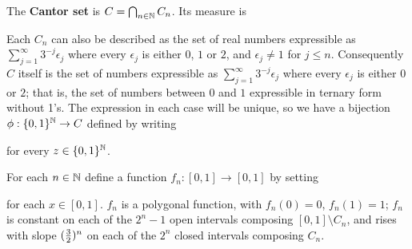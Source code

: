 \medskip
     
The {\bf Cantor set} is $C=\bigcap_{n\in\Bbb N}C_n$.   Its
measure is
     
     
 Each $C_n$ can also be described as the set of
real numbers
expressible as $\sum_{j=1}^{\infty}3^{-j}\epsilon_j$ where every
$\epsilon_j$ is either $0$, $1$ or $2$, and $\epsilon_j\ne 1$ for $j\le
n$.   Consequently $C$ itself is the set of numbers expressible as
$\sum_{j=1}^{\infty}3^{-j}\epsilon_j$ where every $\epsilon_j$ is either
$0$ or $2$;  that is, the set of numbers between $0$ and $1$ expressible
in ternary form without 1's.   The expression in each case will be
unique, so we have a bijection $\phi:\{0,1\}^{\Bbb N}\to C$ defined by
writing
     
     
\noindent for every $z\in\{0,1\}^{\Bbb N}$.
     
 For each $n\in\Bbb N$ define a
function $f_n:[0,1]\to[0,1]$ by setting
     
     
\noindent for each $x\in [0,1]$.    $f_n$ is a polygonal function, with $f_n(0)=0$,
$f_n(1)=1$;  $f_n$ is constant on each of the $2^n-1$ open intervals
composing $[0,1]\setminus C_n$, and rises with slope $({3\over 2})^n$
on each of the $2^n$ closed intervals composing $C_n$.
     
     
